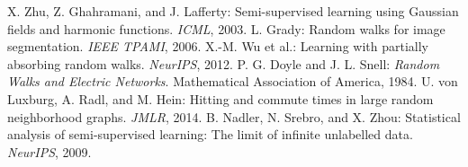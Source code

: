  X. Zhu, Z. Ghahramani, and J. Lafferty: Semi-supervised learning using Gaussian fields and harmonic functions. \textit{ICML}, 2003.
 L. Grady: Random walks for image segmentation. \textit{IEEE TPAMI}, 2006.
 X.-M. Wu et al.: Learning with partially absorbing random walks. \textit{NeurIPS}, 2012.
 P. G. Doyle and J. L. Snell: \textit{Random Walks and Electric Networks}. Mathematical Association of America, 1984.
 U. von Luxburg, A. Radl, and M. Hein: Hitting and commute times in large random neighborhood graphs. \textit{JMLR}, 2014.
 B. Nadler, N. Srebro, and X. Zhou: Statistical analysis of semi-supervised learning: The limit of infinite unlabelled data. \textit{NeurIPS}, 2009.
